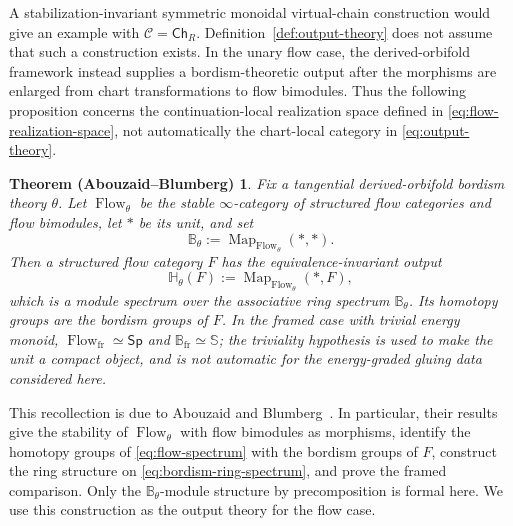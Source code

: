 \documentclass[11pt,letterpaper,twoside]{article}
\theoremstyle{plain}
\newtheorem*{recollection}{Theorem (Abouzaid--Blumberg)}
\theoremstyle{definition}
\theoremstyle{remark}
\let\cite\citep
\newcommand{\Ch}{\mathsf{Ch}}
\begin{document}
A stabilization-invariant symmetric monoidal virtual-chain construction would give an example with \(\mathcal C=\Ch_R\).  Definition~\ref{def:output-theory} does not assume that such a construction exists.  In the unary flow case, the derived-orbifold framework instead supplies a bordism-theoretic output after the morphisms are enlarged from chart transformations to flow bimodules.  Thus the following proposition concerns the continuation-local realization space defined in \eqref{eq:flow-realization-space}, not automatically the chart-local category in \eqref{eq:output-theory}.

\begin{recollection}
Fix a tangential derived-orbifold bordism theory \(\theta\).  Let \(\operatorname{Flow}_\theta\) be the stable \(\infty\)-category of structured flow categories and flow bimodules, let \(*\) be its unit, and set
\begin{equation}\label{eq:bordism-ring-spectrum}
 \mathbb B_\theta
 :=\operatorname{Map}_{\operatorname{Flow}_\theta}(*,*).
\end{equation}
Then a structured flow category \(F\) has the equivalence-invariant output
\begin{equation}\label{eq:flow-spectrum}
 \mathbb H_\theta(F)
 :=\operatorname{Map}_{\operatorname{Flow}_\theta}(*,F),
\end{equation}
which is a module spectrum over the associative ring spectrum \(\mathbb B_\theta\).  Its homotopy groups are the bordism groups of \(F\).  In the framed case with trivial energy monoid, \(\operatorname{Flow}_{\mathrm{fr}}\simeq\mathsf{Sp}\) and \(\mathbb B_{\mathrm{fr}}\simeq\mathbb S\); the triviality hypothesis is used to make the unit a compact object, and is not automatic for the energy-graded gluing data considered here.
\end{recollection}

This recollection is due to Abouzaid and Blumberg~\cite{abouzaidblumberg2024}.  In particular, their results give the stability of \(\operatorname{Flow}_\theta\) with flow bimodules as morphisms, identify the homotopy groups of \eqref{eq:flow-spectrum} with the bordism groups of \(F\), construct the ring structure on \eqref{eq:bordism-ring-spectrum}, and prove the framed comparison.  Only the \(\mathbb B_\theta\)-module structure by precomposition is formal here.  We use this construction as the output theory for the flow case.
\end{document}
